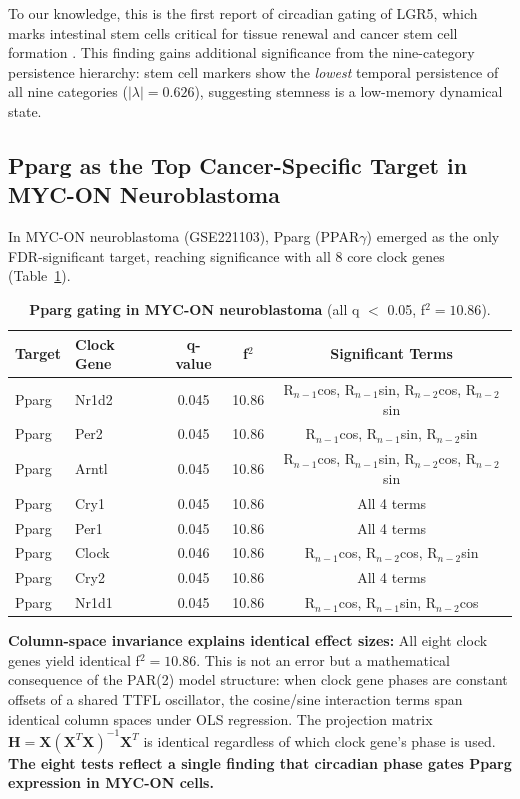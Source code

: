 \documentclass[11pt,a4paper]{article}
\begin{document}
To our knowledge, this is the first report of circadian gating of LGR5, which marks intestinal stem cells critical for tissue renewal and cancer stem cell formation \citep{barker2007}. This finding gains additional significance from the nine-category persistence hierarchy: stem cell markers show the \textit{lowest} temporal persistence of all nine categories ($|\lambda| = 0.626$), suggesting stemness is a low-memory dynamical state.

\subsection{Pparg as the Top Cancer-Specific Target in MYC-ON Neuroblastoma}

In MYC-ON neuroblastoma (GSE221103), Pparg (PPAR$\gamma$) emerged as the only FDR-significant target, reaching significance with all 8 core clock genes (Table~\ref{tab:pparg}).

\begin{table}[H]
\centering
\caption{\textbf{Pparg gating in MYC-ON neuroblastoma} (all q $<$ 0.05, f$^2 = 10.86$).}
\label{tab:pparg}
\begin{tabular}{llccc}
\toprule
Target & Clock Gene & q-value & f$^2$ & Significant Terms \\
\midrule
Pparg & Nr1d2 & 0.045 & 10.86 & R$_{n-1}$cos, R$_{n-1}$sin, R$_{n-2}$cos, R$_{n-2}$sin \\
Pparg & Per2 & 0.045 & 10.86 & R$_{n-1}$cos, R$_{n-1}$sin, R$_{n-2}$sin \\
Pparg & Arntl & 0.045 & 10.86 & R$_{n-1}$cos, R$_{n-1}$sin, R$_{n-2}$cos, R$_{n-2}$sin \\
Pparg & Cry1 & 0.045 & 10.86 & All 4 terms \\
Pparg & Per1 & 0.045 & 10.86 & All 4 terms \\
Pparg & Clock & 0.046 & 10.86 & R$_{n-1}$cos, R$_{n-2}$cos, R$_{n-2}$sin \\
Pparg & Cry2 & 0.045 & 10.86 & All 4 terms \\
Pparg & Nr1d1 & 0.045 & 10.86 & R$_{n-1}$cos, R$_{n-1}$sin, R$_{n-2}$cos \\
\bottomrule
\end{tabular}
\end{table}

\textbf{Column-space invariance explains identical effect sizes:} All eight clock genes yield identical f$^2 = 10.86$. This is not an error but a mathematical consequence of the PAR(2) model structure: when clock gene phases are constant offsets of a shared TTFL oscillator, the cosine/sine interaction terms span identical column spaces under OLS regression. The projection matrix $\mathbf{H} = \mathbf{X}(\mathbf{X}^T\mathbf{X})^{-1}\mathbf{X}^T$ is identical regardless of which clock gene's phase is used. \textbf{The eight tests reflect a single finding that circadian phase gates Pparg expression in MYC-ON cells.}
\end{document}
